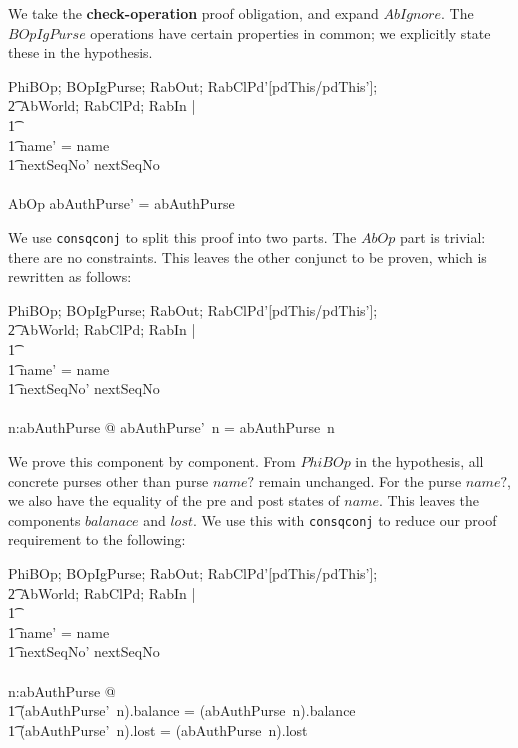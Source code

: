 We take the {\bf check-operation} proof obligation, and expand
$AbIgnore$.  The $BOpIgPurse$ operations have certain properties in
common; we explicitly state these in the hypothesis.
\begin{gzed}
  PhiBOp; BOpIgPurse; RabOut; RabClPd'[pdThis/pdThis'];
  \\ %
  \t2 AbWorld; RabClPd; RabIn  |
  \\ %
  \t1 \pdThisPred \land \chosenLostPred
  \\ %
  \t1 \land name' = name
  \\ %
  \t1 \land nextSeqNo' \geq nextSeqNo
  \\ %
  \shows
  \\ %
  AbOp \land abAuthPurse' = abAuthPurse
\end{gzed}
We use \texttt{consqconj} to split this proof into two parts.  The $AbOp$
part is trivial: there are no constraints.  This leaves the other
conjunct to be proven, which is rewritten as follows:
\begin{gzed}
  PhiBOp; BOpIgPurse; RabOut; RabClPd'[pdThis/pdThis'];
  \\ %
  \t2 AbWorld; RabClPd; RabIn  |
  \\ %
  \t1 \pdThisPred \land \chosenLostPred
  \\ %
  \t1 \land name' = name
  \\ %
  \t1 \land nextSeqNo' \geq nextSeqNo
  \\ %
  \shows
  \\ %
  \forall n:\dom abAuthPurse @ abAuthPurse'~n = abAuthPurse~n
\end{gzed}
We prove this component by component.  From $PhiBOp$ in the
hypothesis, all concrete purses other than purse $name?$ remain
unchanged.  For the purse $name?$, we also have the equality of the
pre and post states of $name$.  This leaves the components
$balanace$ and $lost$.  We use this with \texttt{consqconj} to reduce our
proof requirement to the following:
\begin{gzed}
  PhiBOp; BOpIgPurse; RabOut; RabClPd'[pdThis/pdThis'];
  \\ %
  \t2 AbWorld; RabClPd; RabIn  |
  \\ %
  \t1 \pdThisPred \land \chosenLostPred
  \\ %
  \t1 \land name' = name
  \\ %
  \t1 \land nextSeqNo' \geq nextSeqNo
  \\ %
  \shows
  \\ %
  \forall n:\dom abAuthPurse @
  \\ %
  \t1 (abAuthPurse'~n).balance = (abAuthPurse~n).balance
  \\ %
  \t1 \land (abAuthPurse'~n).lost = (abAuthPurse~n).lost
\end{gzed}
